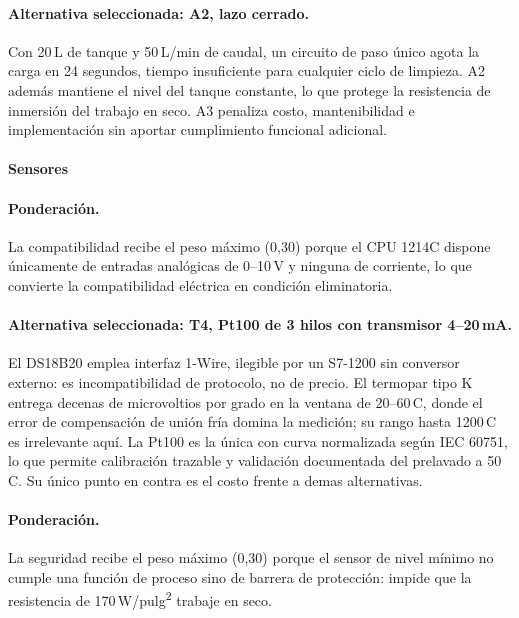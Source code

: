 \paragraph{Alternativa seleccionada: A2, lazo cerrado.} Con 20\,L de tanque y 50\,L/min de caudal, un circuito de paso único agota la carga en 24 segundos, tiempo insuficiente para cualquier ciclo de limpieza. A2 además mantiene el nivel del tanque constante, lo que protege la resistencia de inmersión del trabajo en seco. A3 penaliza costo, mantenibilidad e implementación sin aportar cumplimiento funcional adicional.

\paragraph{Sensores}



\paragraph{Ponderación.} La compatibilidad recibe el peso máximo (0,30) porque el CPU 1214C dispone únicamente de entradas analógicas de 0--10\,V y ninguna de corriente, lo que convierte la compatibilidad eléctrica en condición eliminatoria.

\paragraph{Alternativa seleccionada: T4, Pt100 de 3 hilos con transmisor 4--20\,mA.} El DS18B20 emplea interfaz 1-Wire, ilegible por un S7-1200 sin conversor externo: es incompatibilidad de protocolo, no de precio. El termopar tipo K entrega decenas de microvoltios por grado en la ventana de 20--60\,\textdegree C, donde el error de compensación de unión fría domina la medición; su rango hasta 1200\,\textdegree C es irrelevante aquí. La Pt100 es la única con curva normalizada según IEC 60751, lo que permite calibración trazable y validación documentada del prelavado a 50\,\textdegree C. Su único punto en contra es el costo frente a demas alternativas.



\paragraph{Ponderación.} La seguridad recibe el peso máximo (0,30) porque el sensor de nivel mínimo no cumple una función de proceso sino de barrera de protección: impide que la resistencia de 170\,W/pulg\textsuperscript{2} trabaje en seco.

